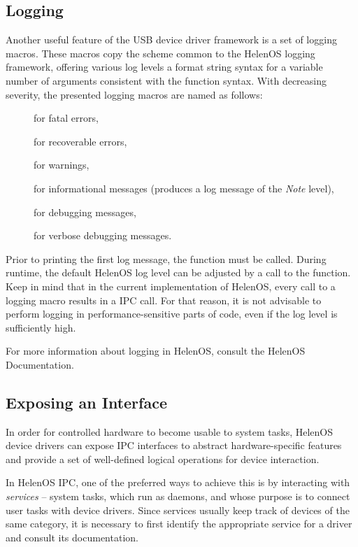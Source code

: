 \subsection{Logging}

Another useful feature of the USB device driver framework is a set of logging
macros. These macros copy the scheme common to the HelenOS logging framework,
offering various log levels a format string syntax for a variable number of
arguments consistent with the  function syntax. With decreasing
severity, the presented logging macros are named as follows:
%
\begin{description}
	\item[] for fatal errors,
	\item[] for recoverable errors,
	\item[] for warnings,
	\item[] for informational messages (produces a log
		message of the \textit{Note} level),
	\item[] for debugging messages,
	\item[] for verbose debugging messages.
\end{description}

Prior to printing the first log message, the  function must be
called. During runtime, the default HelenOS log level can be adjusted by a
call to the  function. Keep in mind that in the
current implementation of HelenOS, every call to a logging macro results in a
IPC call. For that reason, it is not advisable to perform logging in
performance-sensitive parts of code, even if the log level is sufficiently high.

For more information about logging in HelenOS, consult the HelenOS
Documentation.


\subsection{Exposing an Interface}

In order for controlled hardware to become usable to system tasks, HelenOS
device drivers can expose IPC interfaces to abstract hardware-specific features
and provide a set of well-defined logical operations for device interaction.

In HelenOS IPC, one of the preferred ways to achieve this is by interacting with
\textit{services} -- system tasks, which run as daemons, and whose purpose is to
connect user tasks with device drivers. Since services usually keep track of
devices of the same category, it is necessary to first identify the appropriate
service for a driver and consult its documentation.

